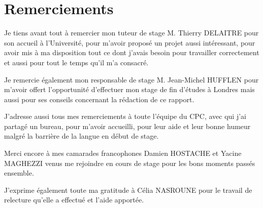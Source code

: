\chapter*{Remerciements}

Je tiens avant tout \`a remercier mon tuteur de stage M. Thierry DELAITRE pour son accueil \`a l'Universit\'e, pour m'avoir propos\'e un projet aussi int\'eressant, pour avoir mis \`a ma disposition tout ce dont j'avais besoin pour travailler correctement et aussi pour tout le temps qu'il m'a consacr\'e.

Je remercie \'egalement mon responsable de stage M. Jean-Michel HUFFLEN pour m'avoir offert l'opportunit\'e d'effectuer mon stage de fin d'\'etudes \`a Londres mais aussi pour ses conseils concernant la r\'edaction de ce rapport.

J'adresse aussi tous mes remerciements \`a toute l'\'equipe du CPC, avec qui j'ai partag\'e un bureau, pour m'avoir accueilli, pour leur aide et leur bonne humeur malgr\'e la barri\`ere de la langue en d\'ebut de stage.

Merci encore \`a mes camarades francophones Damien HOSTACHE et Yacine MAGHEZZI venus me rejoindre en cours de stage pour les bons moments pass\'es ensemble.

J'exprime \'egalement toute ma gratitude \`a C\'elia NASROUNE pour le travail de relecture qu'elle a effectu\'e et l'aide apport\'ee.

\clearpage
